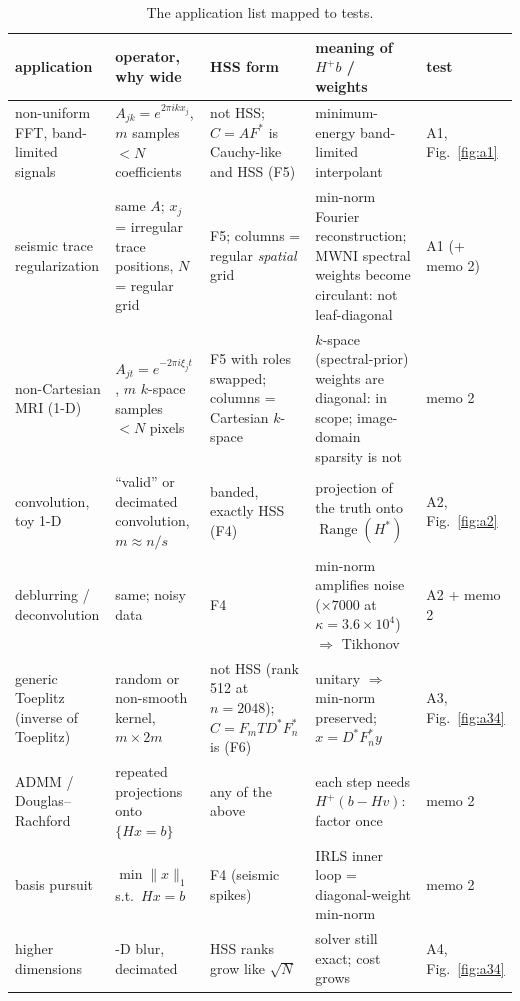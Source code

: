 \begin{table}[!htb]
\centering\footnotesize
\setlength{\tabcolsep}{3pt}
\begin{tabular}{@{}>{\raggedright\arraybackslash}p{2.2cm}>{\raggedright\arraybackslash}p{4.3cm}>{\raggedright\arraybackslash}p{3.2cm}>{\raggedright\arraybackslash}p{4.1cm}>{\raggedright\arraybackslash}p{1.6cm}@{}}
\toprule
application & operator, why wide & HSS form & meaning of $H^+b$ / weights & test\\
\midrule
non-uniform FFT, band-limited signals & $A_{jk}=e^{2\pi ikx_j}$, $m$ samples $<N$ coefficients & not HSS; $C=AF^*$ is Cauchy-like and HSS (F5) & minimum-energy band-limited interpolant & A1, Fig.~\ref{fig:a1}\\
seismic trace regularization & same $A$; $x_j$ = irregular trace positions, $N$ = regular grid & F5; columns = regular \emph{spatial} grid & min-norm Fourier reconstruction; MWNI spectral weights become circulant: not leaf-diagonal & A1 (+ memo 2)\\
non-Cartesian MRI (1-D) & $A_{jt}=e^{-2\pi i\xi_jt}$, $m$ $k$-space samples $<N$ pixels & F5 with roles swapped; columns = Cartesian $k$-space & $k$-space (spectral-prior) weights are diagonal: in scope; image-domain sparsity is not & memo 2\\
convolution, toy 1-D & ``valid'' or decimated convolution, $m\approx n/s$ & banded, exactly HSS (F4) & projection of the truth onto $\operatorname{Range}(H^*)$ & A2, Fig.~\ref{fig:a2}\\
deblurring / deconvolution & same; noisy data & F4 & min-norm amplifies noise ($\times7000$ at $\kappa=3.6\times10^4$) $\Rightarrow$ Tikhonov & A2 + memo 2\\
generic Toeplitz (inverse of Toeplitz) & random or non-smooth kernel, $m\times2m$ & not HSS (rank 512 at $n=2048$); $C=F_mTD^*F_n^*$ is (F6) & unitary $\Rightarrow$ min-norm preserved; $x=D^*F_n^*y$ & A3, Fig.~\ref{fig:a34}\\
ADMM / Douglas--Rachford & repeated projections onto $\{Hx=b\}$ & any of the above & each step needs $H^+(b-Hv)$: factor once & memo 2\\
basis pursuit & $\min\|x\|_1$ s.t.\ $Hx=b$ & F4 (seismic spikes) & IRLS inner loop = diagonal-weight min-norm & memo 2\\
higher dimensions & 2-D blur, decimated & HSS ranks grow like $\sqrt N$ & solver still exact; cost grows & A4, Fig.~\ref{fig:a34}\\
\bottomrule
\end{tabular}
\caption{The application list mapped to tests.}
\label{tab:apps}
\end{table}

